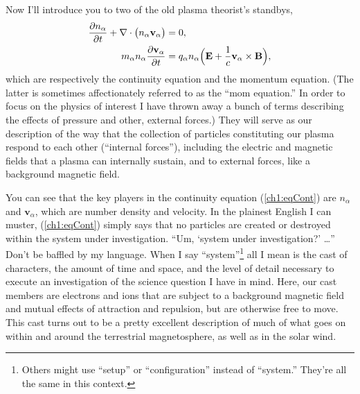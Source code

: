 Now I'll introduce you to two of the old plasma theorist's standbys,
\begin{subequations}
  \begin{align} 
    \dfrac{\partial n_{\alpha}}{\partial t} + {\bf \nabla} \cdot \big (n_{\alpha} \mathbf{v}_{\alpha} \big ) &= 0, \label{ch1:eqCont} \\
    m_{\alpha} n_{\alpha} \dfrac{\partial \mathbf{v}_{\alpha}}{\partial t} &=
    q_{\alpha} n_{\alpha} \Big ( \mathbf{E} + \dfrac{1}{c} \mathbf{v}_{\alpha}
    \times \mathbf{B} \Big ), \label{ch1:eqMom}
  \end{align}
\end{subequations}
which are respectively the continuity equation and the momentum equation. (The
latter is sometimes affectionately referred to as the ``mom equation.'' In order
to focus on the physics of interest I have thrown away a bunch of terms
describing the effects of pressure and other, external forces.) They will serve
as our description of the way that the collection of particles constituting our
plasma respond to each other (``internal forces''), including the electric and
magnetic fields that a plasma can internally sustain, and to external forces,
like a background magnetic field.

You can see that the key players in the continuity equation (\ref{ch1:eqCont})
are $n_{\alpha}$ and $\mathbf{v}_{\alpha}$, which are number density and
velocity. In the plainest English I can muster, (\ref{ch1:eqCont}) simply says
that no particles are created or destroyed within the system under
investigation. ``Um, `system under investigation?' \dots'' Don't be baffled by
my language. When I say ``system''\footnote{Others might use ``setup'' or
  ``configuration'' instead of ``system.'' They're all the same in this
  context.} all I mean is the cast of characters, the amount of time and space,
and the level of detail necessary to execute an investigation of the science
question I have in mind. Here, our cast members are electrons and ions that are
subject to a background magnetic field and mutual effects of attraction and
repulsion, but are otherwise free to move. This cast turns out to be a pretty
excellent description of much of what goes on within and around the terrestrial
magnetosphere, as well as in the solar wind.

